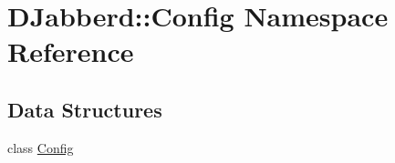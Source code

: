 \hypertarget{namespace_d_jabberd_1_1_config}{
\section{\-D\-Jabberd\-:\-:\-Config \-Namespace \-Reference}
\label{namespace_d_jabberd_1_1_config}
}
\subsection*{\-Data \-Structures}
\begin{DoxyCompactItemize}
\item 
class \hyperlink{class_d_jabberd_1_1_config_1_1_config}{\-Config}
\end{DoxyCompactItemize}
